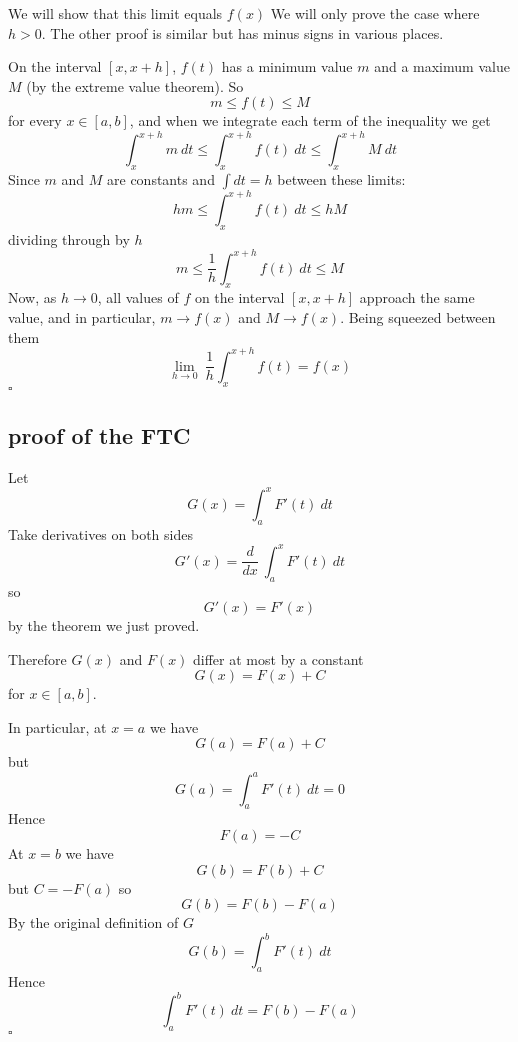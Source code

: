 \documentclass[11pt, oneside]{article}   	%
\begin{document}
We will show that this limit equals $f(x)$  We will only prove the case where $h > 0$.  The other proof is similar but has minus signs in various places.

On the interval $[x, x+h]$, $f(t)$ has a minimum value $m$ and a maximum value $M$ (by the extreme value theorem).  So
\[ m \le f(t) \le M \]
for every $x \in [a,b]$,
and when we integrate each term of the inequality we get
\[ \int_x^{x+h} m \ dt \le \int_x^{x+h} f(t) \ dt \le \int_x^{x+h} M \ dt \]
Since $m$ and $M$ are constants and $\int dt = h$ between these limits:
\[ hm \le \int_x^{x+h} f(t) \ dt \le hM \]
dividing through by $h$
\[ m \le \frac{1}{h} \int_x^{x+h} f(t) \ dt \le M \]
Now, as $h \rightarrow 0$, all values of $f$ on the interval $[x,x+h]$ approach the same value, and in particular, $m \rightarrow f(x)$ and $M \rightarrow f(x)$.  Being squeezed between them
\[ \lim_{h \rightarrow 0} \ \frac{1}{h} \int_x^{x+h} f(t) = f(x) \]
$\square$

\subsection*{proof of the FTC}
Let 
\[ G(x) = \int_a^x F'(t) \ dt \]
Take derivatives on both sides
\[ G'(x) = \frac{d}{dx} \ \int_a^x F'(t) \ dt \]
so
\[ G'(x) = F'(x) \]
by the theorem we just proved.

Therefore $G(x)$ and $F(x)$ differ at most by a constant
\[ G(x) = F(x) + C \]
for $x \in [a,b]$.

In particular, at $x = a$ we have
\[ G(a) = F(a) + C \]
but
\[ G(a) = \int_a^a F'(t) \ dt = 0 \]
Hence
\[ F(a) = - C \]
At $x = b$ we have
\[ G(b) = F(b) + C \]
but $C = - F(a)$
so
\[ G(b) = F(b) - F(a) \]
By the original definition of $G$
\[ G(b) = \int_a^b F'(t) \ dt \]
Hence
\[ \int_a^b F'(t) \ dt = F(b) - F(a) \]
$\square$
\end{document}

